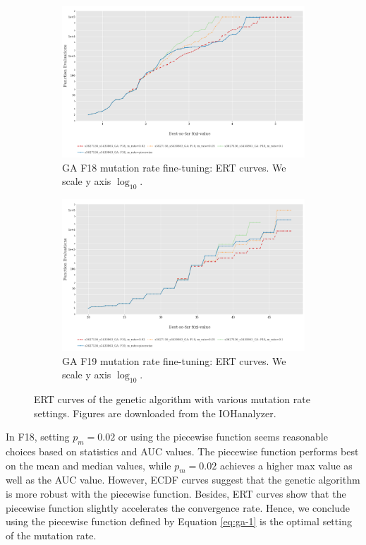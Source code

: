 \documentclass{article}
\begin{document}
\begin{figure}[!ht]
    \centering
    \begin{subfigure}[h]{0.95\linewidth}
        \includegraphics[width=\linewidth]{ga/f18/mrate_ert.png}
        \caption{GA F18 mutation rate fine-tuning: ERT curves. We scale y axis $\log_{10}$.}
    \end{subfigure}
    \hfill
    \begin{subfigure}[h]{0.95\linewidth}
        \includegraphics[width=\linewidth]{ga/f19/mrate_ert.png}
        \caption{GA F19 mutation rate fine-tuning: ERT curves. We scale y axis $\log_{10}$.}
    \end{subfigure}
    \caption{ERT curves of the genetic algorithm with various mutation rate settings. Figures are downloaded from the IOHanalyzer.}
    \label{fig:experi-ga-mrate-ert}
\end{figure}

In F18, setting $p_m = 0.02$ or using the piecewise function seems reasonable choices based on statistics and AUC values. The piecewise function performs best on the mean and median values, while $p_m = 0.02$ achieves a higher max value as well as the AUC value. However, ECDF curves suggest that the genetic algorithm is more robust with the piecewise function. Besides, ERT curves show that the piecewise function slightly accelerates the convergence rate. Hence, we conclude using the piecewise function defined by Equation \ref{eq:ga-1} is the optimal setting of the mutation rate.
\end{document}
